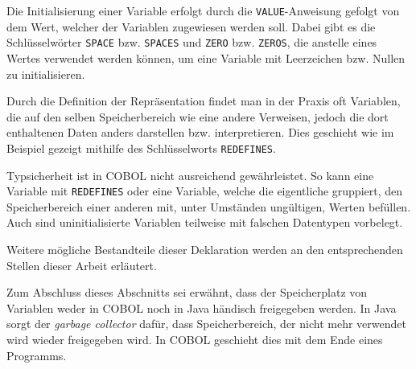 Die Initialisierung einer Variable erfolgt durch die \texttt{VALUE}-Anweisung gefolgt von dem Wert, welcher der Variablen zugewiesen werden soll. Dabei gibt es die Schlüsselwörter \texttt{SPACE} bzw. \texttt{SPACES} und \texttt{ZERO} bzw. \texttt{ZEROS}, die anstelle eines Wertes verwendet werden können, um eine Variable mit Leerzeichen bzw. Nullen zu initialisieren.

Durch die Definition der Repräsentation findet man in der Praxis oft Variablen, die auf den selben Speicherbereich wie eine andere Verweisen, jedoch die dort enthaltenen Daten anders darstellen bzw. interpretieren. Dies geschieht wie im Beispiel gezeigt mithilfe des Schlüsselworts \texttt{REDEFINES}.

Typsicherheit ist in COBOL nicht ausreichend gewährleistet. So kann eine Variable mit \texttt{REDEFINES} oder eine Variable, welche die eigentliche gruppiert, den Speicherbereich einer anderen mit, unter Umständen ungültigen, Werten befüllen. Auch sind uninitialisierte Variablen teilweise mit falschen Datentypen vorbelegt. 

Weitere mögliche Bestandteile dieser Deklaration werden an den entsprechenden Stellen dieser Arbeit erläutert.

Zum Abschluss dieses Abschnitts sei erwähnt, dass der Speicherplatz von Variablen weder in COBOL noch in Java händisch freigegeben werden. In Java sorgt der \textit{garbage collector} dafür, dass Speicherbereich, der nicht mehr verwendet wird wieder freigegeben wird. In COBOL geschieht dies mit dem Ende eines Programms.
